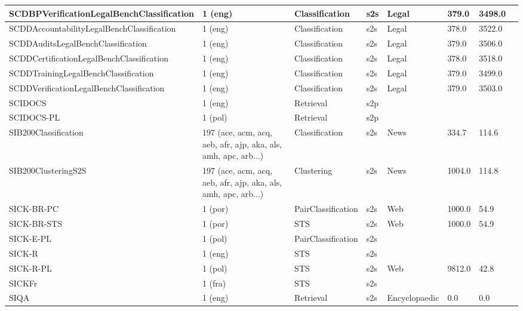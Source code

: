 \begin{longtable}{L{5.0cm}|L{1.5cm}L{1.4cm}L{1.4cm}L{1.4cm}L{1.4cm}L{1.0cm}L{1.0cm}}
 \hline 
SCDBPVerificationLegalBenchClassification \cite{guha2023legalbench} & 1 (eng) & Classification & s2s & Legal & 379.0 & 3498.0 \\
 \hline 
SCDDAccountabilityLegalBenchClassification \cite{guha2023legalbench} & 1 (eng) & Classification & s2s & Legal & 378.0 & 3522.0 \\
 \hline 
SCDDAuditsLegalBenchClassification \cite{guha2023legalbench} & 1 (eng) & Classification & s2s & Legal & 379.0 & 3506.0 \\
 \hline 
SCDDCertificationLegalBenchClassification \cite{guha2023legalbench} & 1 (eng) & Classification & s2s & Legal & 378.0 & 3518.0 \\
 \hline 
SCDDTrainingLegalBenchClassification \cite{guha2023legalbench} & 1 (eng) & Classification & s2s & Legal & 379.0 & 3499.0 \\
 \hline 
SCDDVerificationLegalBenchClassification \cite{guha2023legalbench} & 1 (eng) & Classification & s2s & Legal & 379.0 & 3503.0 \\
 \hline 
SCIDOCS \cite{specter2020cohan} & 1 (eng) & Retrieval & s2p &  &  &  \\
 \hline 
SCIDOCS-PL \cite{wojtasik2024beirpl} & 1 (pol) & Retrieval & s2p &  &  &  \\
 \hline 
SIB200Classification \cite{adelani2023sib} & 197 (ace, acm, acq, aeb, afr, ajp, aka, als, amh, apc, arb...) & Classification & s2s & News & 334.7 & 114.6 \\
 \hline 
SIB200ClusteringS2S \cite{adelani2023sib} & 197 (ace, acm, acq, aeb, afr, ajp, aka, als, amh, apc, arb...) & Clustering & s2s & News & 1004.0 & 114.8 \\
 \hline 
SICK-BR-PC \cite{real18} & 1 (por) & PairClassification & s2s & Web & 1000.0 & 54.9 \\
 \hline 
SICK-BR-STS \cite{real18} & 1 (por) & STS & s2s & Web & 1000.0 & 54.9 \\
 \hline 
SICK-E-PL \cite{dadas-etal-2020-evaluation} & 1 (pol) & PairClassification & s2s &  &  &  \\
 \hline 
SICK-R \cite{marelli-etal-2014-sick} & 1 (eng) & STS & s2s &  &  &  \\
 \hline 
SICK-R-PL \cite{dadas-etal-2020-evaluation} & 1 (pol) & STS & s2s & Web & 9812.0 & 42.8 \\
 \hline 
SICKFr  & 1 (fra) & STS & s2s &  &  &  \\
 \hline 
SIQA \cite{xiao2024rar} & 1 (eng) & Retrieval & s2s & Encyclopaedic & 0.0 & 0.0 \\
 \hline 

\end{longtable}
